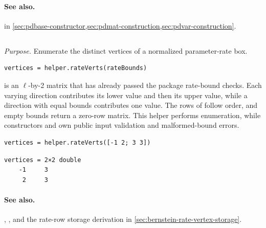 \paragraph{See also.}  in \cref{sec:pdbase-constructor,sec:pdmat-construction,sec:pdvar-construction}.

\subsection{\texorpdfstring{}{helper.rateVerts}}

\textit{Purpose.} Enumerate the distinct vertices of a normalized parameter-rate box.

\syntaxhead
\begin{lstlisting}[style=dpsyntax]
vertices = helper.rateVerts(rateBounds)
\end{lstlisting}

\descriptionhead
{} is an $\ell$-by-2 matrix that has already passed the package rate-bound checks. Each varying direction contributes its lower value and then its upper value, while a direction with equal bounds contributes one value. The rows of  follow  order, and empty bounds return a zero-row matrix. This helper performs enumeration, while constructors and  own public input validation and malformed-bound errors.

\examplehead
\begin{lstlisting}[style=dpmatlab]
vertices = helper.rateVerts([-1 2; 3 3])
\end{lstlisting}
\begin{lstlisting}[style=dpoutput]
vertices = 2×2 double
    -1     3
     2     3
\end{lstlisting}

\paragraph{See also.} , , and the rate-row storage derivation in \cref{sec:bernstein-rate-vertex-storage}.
